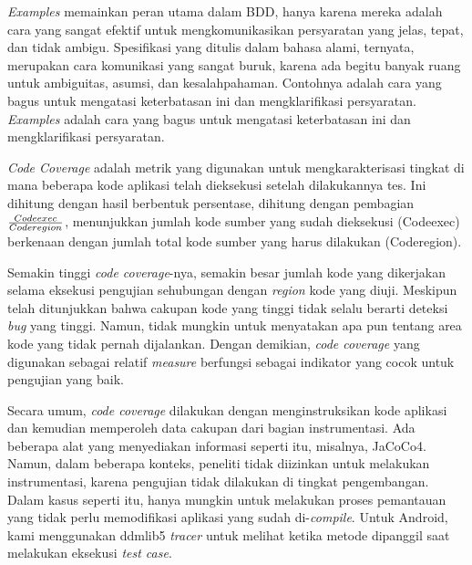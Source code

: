\documentclass[a4paper,twoside]{article}
\begin{document}
\begin{enumerate}
\textit{Examples} memainkan peran utama dalam BDD, hanya karena mereka adalah cara yang sangat efektif untuk mengkomunikasikan persyaratan yang jelas, tepat, dan tidak ambigu. Spesifikasi yang ditulis dalam bahasa alami, ternyata, merupakan cara komunikasi yang sangat buruk, karena ada begitu banyak ruang untuk ambiguitas, asumsi, dan kesalahpahaman. Contohnya adalah cara yang bagus untuk mengatasi keterbatasan ini dan mengklarifikasi persyaratan. \textit{Examples} adalah cara yang bagus untuk mengatasi keterbatasan ini dan mengklarifikasi persyaratan.

\textit{Code Coverage} adalah metrik yang digunakan untuk mengkarakterisasi tingkat di mana beberapa  kode aplikasi telah dieksekusi setelah dilakukannya tes. Ini dihitung dengan hasil berbentuk persentase, dihitung dengan pembagian $\frac{Code{\tiny exec}}{Code{\tiny region}}$, menunjukkan jumlah kode sumber yang sudah dieksekusi (Code{\tiny exec}) berkenaan dengan jumlah total kode sumber yang harus dilakukan (Code{\tiny region}).

Semakin tinggi \textit{code coverage}-nya, semakin besar jumlah kode yang dikerjakan selama eksekusi pengujian sehubungan dengan \textit{region} kode yang diuji. Meskipun telah ditunjukkan bahwa cakupan kode yang tinggi tidak selalu berarti deteksi \textit{bug} yang tinggi. Namun, tidak mungkin untuk menyatakan apa pun tentang area kode yang tidak pernah dijalankan. Dengan demikian, \textit{code coverage} yang digunakan sebagai relatif \textit{measure} berfungsi sebagai indikator yang cocok untuk pengujian yang baik.

Secara umum, \textit{code coverage} dilakukan dengan menginstruksikan kode aplikasi dan kemudian memperoleh data cakupan dari bagian instrumentasi. Ada beberapa alat yang menyediakan informasi seperti itu, misalnya, JaCoCo4. Namun, dalam beberapa konteks, peneliti tidak diizinkan untuk melakukan instrumentasi, karena pengujian tidak dilakukan di tingkat pengembangan. Dalam kasus seperti itu, hanya mungkin untuk melakukan proses pemantauan yang tidak perlu memodifikasi aplikasi yang sudah di-\textit{compile}. Untuk Android, kami menggunakan ddmlib5 \textit{tracer} untuk melihat ketika metode dipanggil saat melakukan eksekusi \textit{test case}.


\end{enumerate}
\end{document}
